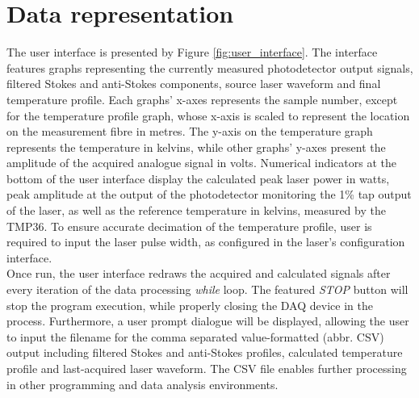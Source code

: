 \documentclass{standalone}
\begin{document}
\section{Data representation}

The user interface is presented by Figure \ref{fig:user_interface}. The interface features graphs representing the currently measured photodetector output signals, filtered Stokes and anti-Stokes components, source laser waveform and final temperature profile. Each graphs' x-axes represents the sample number, except for the temperature profile graph, whose x-axis is scaled to represent the location on the measurement fibre in metres. The y-axis on the temperature graph represents the temperature in kelvins, while other graphs' y-axes present the amplitude of the acquired analogue signal in volts. Numerical indicators at the bottom of the user interface display the calculated peak laser power in watts, peak amplitude at the output of the photodetector monitoring the 1\% tap output of the laser, as well as the reference temperature in kelvins, measured by the TMP36. To ensure accurate decimation of the temperature profile, user is required to input the laser pulse width, as configured in the laser's configuration interface. \\

Once run, the user interface redraws the acquired and calculated signals after every iteration of the data processing \textit{while} loop. The featured \textit{STOP} button will stop the program execution, while properly closing the DAQ device in the process. Furthermore, a user prompt dialogue will be displayed, allowing the user to input the filename for the comma separated value-formatted (abbr. CSV) output including filtered Stokes and anti-Stokes profiles, calculated temperature profile and last-acquired laser waveform. The CSV file enables further processing in other programming and data analysis environments.



\setcounter{stranica}{\thepage}
\addtocounter{stranica}{1}
\end{document}
